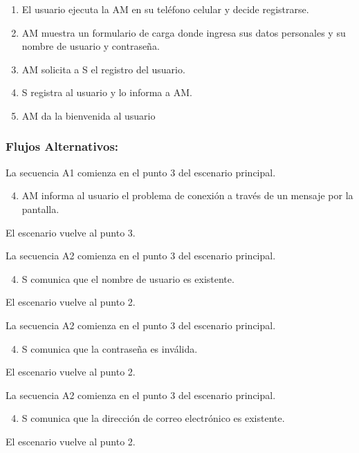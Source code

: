 \begin{framed}
\begin{enumerate}
    \item El usuario ejecuta la AM en su teléfono celular y decide registrarse. 
    \item AM muestra un formulario de carga donde ingresa sus datos personales y su nombre de usuario y contraseña.
    \item AM solicita a S el registro del usuario. 
    \item S registra al usuario y lo informa a AM. 
    \item AM da la bienvenida al usuario
   
\end{enumerate}

\subsubsection{Flujos Alternativos: }

La secuencia A1 comienza en el punto 3 del escenario principal. 
\begin{enumerate}
    \setcounter{enumi}{3}
    \item AM informa al usuario el problema de conexión a través de un mensaje por la pantalla.
\end{enumerate}
El escenario vuelve al punto 3. 


La secuencia A2 comienza en el punto 3 del escenario principal.
\begin{enumerate}
    \setcounter{enumi}{3}
        \item S comunica que el nombre de usuario es existente.
\end{enumerate}
El escenario vuelve al punto 2. 


La secuencia A2 comienza en el punto 3 del escenario principal. 
\begin{enumerate}
    \setcounter{enumi}{3}
    \item S comunica que la contraseña es inválida. 
\end{enumerate}
El escenario vuelve al punto 2. 

La secuencia A2 comienza en el punto 3 del escenario principal. 
\begin{enumerate}
    \setcounter{enumi}{3}
    \item S comunica que la dirección de correo electrónico es existente. 
\end{enumerate}
El escenario vuelve al punto 2. 

\end{framed}

